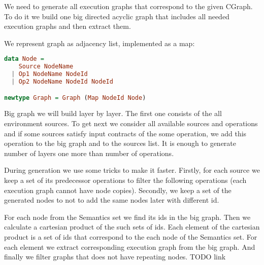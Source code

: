We need to generate all execution graphs that correspond to the given CGraph.
To do it we build one big directed acyclic graph that includes all needed execution graphs and then extract them.

We represent graph as adjacency list, implemented as a map:

\begin{lstlisting}[language=Haskell]
data Node =
    Source NodeName
  | Op1 NodeName NodeId
  | Op2 NodeName NodeId NodeId

newtype Graph = Graph (Map NodeId Node)
\end{lstlisting}

Big graph we will build layer by layer.
The first one consists of the all environment sources.
To get next we consider all available sources and operations and if some sources satisfy input contracts of the some operation, we add this operation to the big graph and to the sources list.
It is enough to generate number of layers one more than number of operations.

During generation we use some tricks to make it faster.
Firstly, for each source we keep a set of its predecessor operations to filter the following operations (each execution graph cannot have node copies).
Secondly, we keep a set of the generated nodes to not to add the same nodes later with different id.

For each node from the Semantics set we find its ids in the big graph.
Then we calculate a cartesian product of the such sets of ids.
Each element of the cartesian product is a set of ids that correspond to the each node of the Semantics set.
For each element we extract corresponding execution graph from the big graph.
And finally we filter graphs that does not have repeating nodes.
TODO link 
